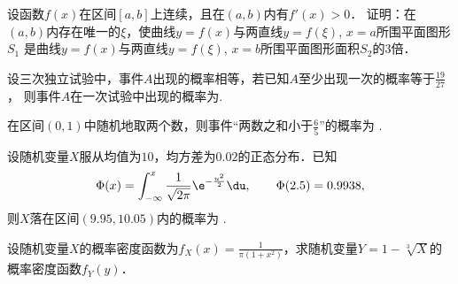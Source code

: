 \documentclass[plain,noanswer,medmath]{../../template/jnuexam}
\begin{document}

\begin{problem}
设函数$f(x)$在区间$[a,b]$上连续，且在$(a,b)$内有$f'(x)>0$．
证明：在$(a,b)$内存在唯一的$\xi$，使曲线$y=f(x)$与两直线$y=f(\xi)$, $x=a$所围平面图形$S_1$
是曲线$y=f(x)$与两直线$y=f(\xi)$, $x=b$所围平面图形面积$S_2$的$3$倍．
\end{problem}




\begin{problem}
设三次独立试验中，事件$A$出现的概率相等，若已知$A$至少出现一次的概率等于$\frac{19}{27}$，
则事件$A$在一次试验中出现的概率为\fillin{}.
\end{problem}


\begin{problem}
在区间$(0,1)$中随机地取两个数，则事件“两数之和小于$\frac{6}{5}$”的概率为 \fillin{}.
\end{problem}


\begin{problem}
设随机变量$X$服从均值为$10$，均方差为$0.02$的正态分布．已知
$$\Phi(x)=\int_{-\infty}^x\frac{1}{\sqrt{2\pi}}\e^{-\frac{u^2}{2}}\du,\qquad \Phi(2.5)=0.9938,$$
则$X$落在区间$(9.95,10.05)$内的概率为 \fillin{}.
\end{problem}



\begin{problem}
设随机变量$X$的概率密度函数为$f_X(x)=\frac{1}{\pi(1+x^2)}$，求随机变量$Y=1-\sqrt[3]{X}$的概率密度函数$f_Y(y)$．
\end{problem}
\end{document}
